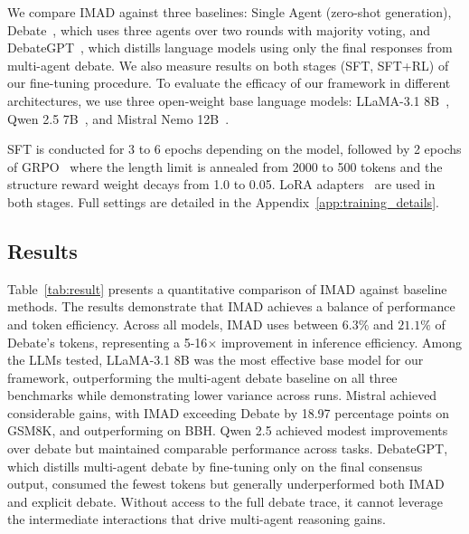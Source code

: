 \documentclass[11pt]{article}
\begin{document}
We compare IMAD against three baselines: Single Agent (zero-shot generation), Debate~\cite{Du2023Improving}, which uses three agents over two rounds with majority voting, and DebateGPT~\cite{subramaniam2024debategpt}, which distills language models using only the final responses from multi-agent debate. We also measure results on both stages (SFT, SFT+RL) of our fine-tuning procedure.
To evaluate the efficacy of our framework in different architectures, we use three open-weight base language models: LLaMA-3.1 8B~\cite{dubey2024llama}, Qwen 2.5 7B~\cite{qwen2025qwen25technicalreport}, and Mistral Nemo 12B~\cite{MistralNemo2024}. 

SFT is conducted for 3 to 6 epochs depending on the model, followed by 2 epochs of GRPO~\cite{shao2024deepseekmathpushinglimitsmathematical} where the length limit is annealed from 2000 to 500 tokens and the structure reward weight decays from 1.0 to 0.05. LoRA adapters~\cite{hu2022lora} are used in both stages. Full settings are detailed in the Appendix~\ref{app:training_details}.


\subsection{Results}
Table~\ref{tab:result} presents a quantitative comparison of IMAD against baseline methods. The results demonstrate that IMAD achieves a balance of performance and token efficiency. Across all models, IMAD uses between $6.3\%$ and $21.1\%$ of Debate's tokens, representing a 5-16$\times$ improvement in inference efficiency. 
Among the LLMs tested, LLaMA-3.1 8B was the most effective base model for our framework, outperforming the multi-agent debate baseline on all three benchmarks while demonstrating lower variance across runs.
Mistral achieved considerable gains, with IMAD exceeding Debate by 18.97 percentage points on GSM8K, and outperforming on BBH.
Qwen 2.5 achieved modest improvements over debate but maintained comparable performance across tasks.
DebateGPT, which distills multi-agent debate by fine-tuning only on the final consensus output, consumed the fewest tokens but generally underperformed both IMAD and explicit debate. Without access to the full debate trace, it cannot leverage the intermediate interactions that drive multi-agent reasoning gains. 
\end{document}
